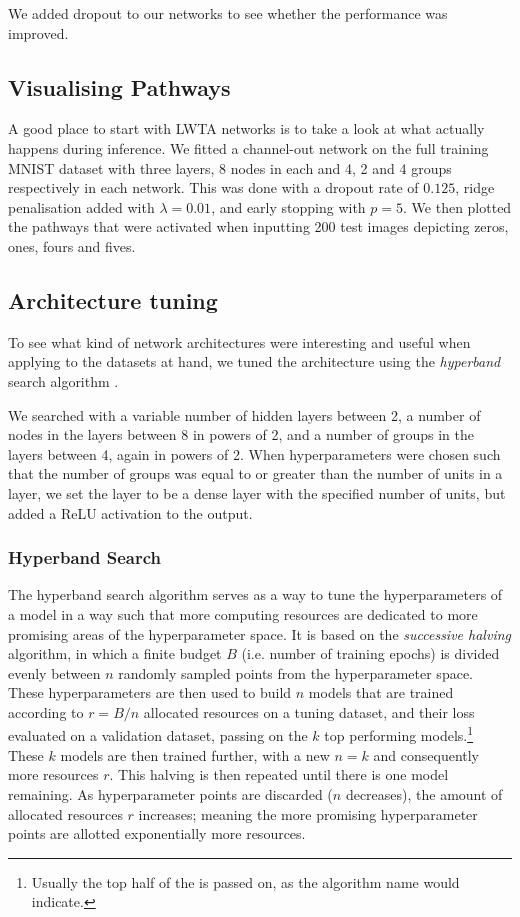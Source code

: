         We added dropout to our networks to see whether the performance was improved. 


\subsection{Visualising Pathways}
    A good place to start with LWTA networks is to take a look at what actually happens during inference. We fitted a channel-out network on the full training MNIST dataset with three layers, 8 nodes in each and 4, 2 and 4 groups respectively in each network. This was done with a dropout rate of $0.125$, ridge penalisation added with $\lambda = 0.01$, and early stopping with $p=5$. We then plotted the pathways that were activated when inputting 200 test images depicting zeros, ones, fours and fives.

\subsection{Architecture tuning}
    To see what kind of network architectures were interesting and useful when applying to the datasets at hand, we tuned the architecture using the \textit{hyperband} search algorithm \citep{Hyperband}.

    We searched with a variable number of hidden layers between 2, a number of nodes in the layers between 8 in powers of 2, and a number of groups in the layers between 4, again in powers of 2. When hyperparameters were chosen such that the number of groups was equal to or greater than the number of units in a layer, we set the layer to be a dense layer with the specified number of units, but added a ReLU activation to the output.

    \subsubsection{Hyperband Search}
        The hyperband search algorithm serves as a way to tune the hyperparameters of a model in a way such that more computing resources are dedicated to more promising areas of the hyperparameter space. It is based on the \textit{successive halving} algorithm, in which a finite budget $B$ (i.e. number of training epochs) is divided evenly between $n$ randomly sampled points from the hyperparameter space. These hyperparameters are then used to build $n$ models that are trained according to $r = B/n$ allocated resources on a tuning dataset, and their loss evaluated on a validation dataset, passing on the $k$ top performing models.\footnote{Usually the top half of the is passed on, as the algorithm name would indicate.} 
        These $k$ models are then trained further, with a new $n=k$ and consequently more resources $r$. This halving is then repeated until there is one model remaining. As hyperparameter points are discarded ($n$ decreases), the amount of allocated resources $r$ increases; meaning the more promising hyperparameter points are allotted exponentially more resources.

